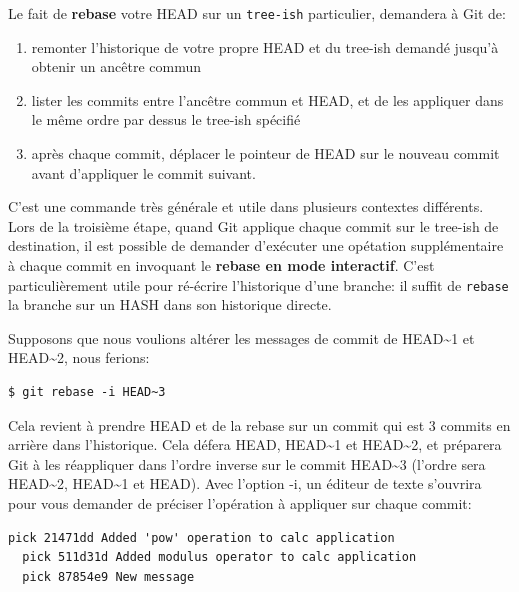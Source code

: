 \documentclass{../../common/tufte-latex/tufte-handout}
\begin{document}
Le fait de \textbf{rebase} votre HEAD sur un \texttt{tree-ish} particulier, demandera à Git de:

\begin{enumerate} 
 \item{remonter l'historique de votre propre HEAD et du tree-ish demandé jusqu'à obtenir un ancêtre commun}
 \item{lister les commits entre l'ancêtre commun et HEAD, et de les appliquer dans le même ordre par dessus le tree-ish spécifié}
 \item{après chaque commit, déplacer le pointeur de HEAD sur le nouveau commit avant d'appliquer le commit suivant.}
\end{enumerate}

C'est une commande très générale et utile dans plusieurs contextes différents.
Lors de la troisième étape, quand Git applique chaque commit sur le tree-ish de destination, il est possible de demander d'exécuter une opétation supplémentaire à chaque commit en invoquant le \textbf{rebase en mode interactif}.
C'est particulièrement utile pour ré-écrire l'historique d'une branche: il suffit de \texttt{rebase} la branche sur un HASH dans son historique directe.

Supposons que nous voulions altérer les messages de commit de HEAD\textasciitilde1 et HEAD\textasciitilde2, nous ferions:

\begin{lstlisting}[style=BashInputStyle]
  $ git rebase -i HEAD~3
\end{lstlisting}

Cela revient à prendre HEAD et de la rebase sur un commit qui est 3 commits en arrière dans l'historique. Cela défera HEAD, HEAD\textasciitilde1 et HEAD\textasciitilde2, et préparera Git à les réappliquer dans l'ordre inverse sur le commit HEAD\textasciitilde3 (l'ordre sera HEAD\textasciitilde2, HEAD\textasciitilde1 et HEAD). 
Avec l'option -i, un éditeur de texte s'ouvrira pour vous demander de préciser l'opération à appliquer sur chaque commit:

\begin{lstlisting}[style=BashInputStyle]
  pick 21471dd Added 'pow' operation to calc application
  pick 511d31d Added modulus operator to calc application
  pick 87854e9 New message
\end{lstlisting}
\end{document}
